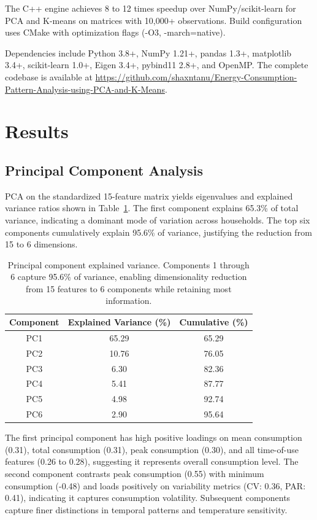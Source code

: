 \documentclass[11pt]{article}
\begin{document}
The C++ engine achieves 8 to 12 times speedup over NumPy/scikit-learn for PCA and K-means on matrices with 10,000+ observations. Build configuration uses CMake with optimization flags (-O3, -march=native).

Dependencies include Python 3.8+, NumPy 1.21+, pandas 1.3+, matplotlib 3.4+, scikit-learn 1.0+, Eigen 3.4+, pybind11 2.8+, and OpenMP. The complete codebase is available at \url{https://github.com/shaxntanu/Energy-Consumption-Pattern-Analysis-using-PCA-and-K-Means}.

\section{Results}

\subsection{Principal Component Analysis}

PCA on the standardized 15-feature matrix yields eigenvalues and explained variance ratios shown in Table~\ref{tab:pca_variance}. The first component explains 65.3\% of total variance, indicating a dominant mode of variation across households. The top six components cumulatively explain 95.6\% of variance, justifying the reduction from 15 to 6 dimensions.

\begin{table}[ht]
\centering
\caption{Principal component explained variance. Components 1 through 6 capture 95.6\% of variance, enabling dimensionality reduction from 15 features to 6 components while retaining most information.}
\label{tab:pca_variance}
\begin{tabular}{ccc}
\toprule
\textbf{Component} & \textbf{Explained Variance (\%)} & \textbf{Cumulative (\%)} \\
\midrule
PC1 & 65.29 & 65.29 \\
PC2 & 10.76 & 76.05 \\
PC3 & 6.30 & 82.36 \\
PC4 & 5.41 & 87.77 \\
PC5 & 4.98 & 92.74 \\
PC6 & 2.90 & 95.64 \\
\bottomrule
\end{tabular}
\end{table}

The first principal component has high positive loadings on mean consumption (0.31), total consumption (0.31), peak consumption (0.30), and all time-of-use features (0.26 to 0.28), suggesting it represents overall consumption level. The second component contrasts peak consumption (0.55) with minimum consumption (-0.48) and loads positively on variability metrics (CV: 0.36, PAR: 0.41), indicating it captures consumption volatility. Subsequent components capture finer distinctions in temporal patterns and temperature sensitivity.
\end{document}
